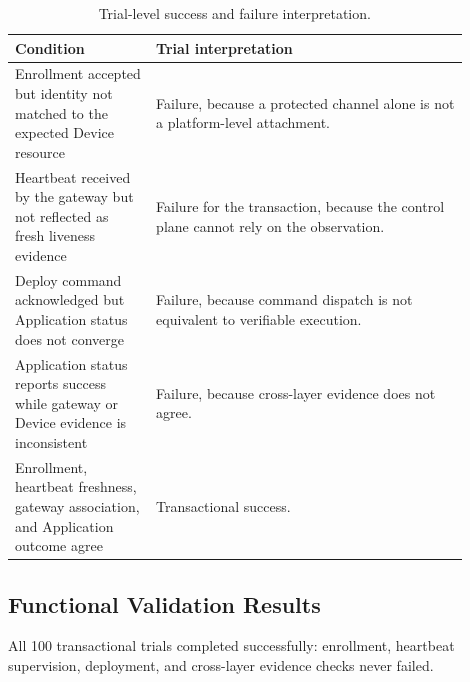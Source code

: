 \begin{table}[pos=t]
\centering
\caption{Trial-level success and failure interpretation.}
\label{tab:trial-semantics}
\footnotesize
\setlength{\tabcolsep}{3pt}
\begin{tabular}{p{0.28\linewidth} p{0.62\linewidth}}
\toprule
\textbf{Condition} & \textbf{Trial interpretation} \\
\midrule
Enrollment accepted but identity not matched to the expected Device resource & Failure, because a protected channel alone is not a platform-level attachment. \\
Heartbeat received by the gateway but not reflected as fresh liveness evidence & Failure for the transaction, because the control plane cannot rely on the observation. \\
Deploy command acknowledged but Application status does not converge & Failure, because command dispatch is not equivalent to verifiable execution. \\
Application status reports success while gateway or Device evidence is inconsistent & Failure, because cross-layer evidence does not agree. \\
Enrollment, heartbeat freshness, gateway association, and Application outcome agree & Transactional success. \\
\bottomrule
\end{tabular}
\end{table}
\endgroup


\subsection{Functional Validation Results}\label{sec:functional-results}
All 100 transactional trials completed successfully: enrollment, heartbeat supervision, deployment, and cross-layer evidence checks never failed.  %

